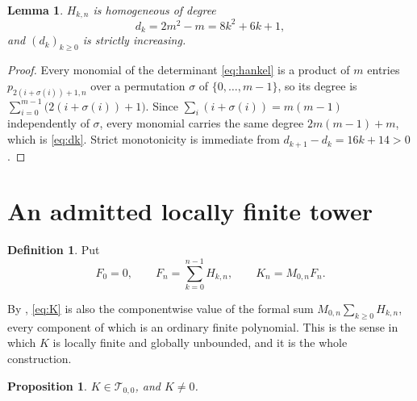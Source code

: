 \documentclass[11pt,reqno]{amsart}
\theoremstyle{plain}
\newtheorem{lemma}[theorem]{Lemma}
\newtheorem{proposition}[theorem]{Proposition}
\theoremstyle{definition}
\newtheorem{definition}[theorem]{Definition}
\theoremstyle{remark}
\numberwithin{equation}{section}
\begin{document}
\begin{lemma}
  \label{lem:degree}
  $H_{k,n}$ is homogeneous of degree
  \begin{equation}
    \label{eq:dk}
    d_k=2m^2-m=8k^2+6k+1,
  \end{equation}
  and $(d_k)_{k\ge0}$ is strictly increasing.
\end{lemma}

\begin{proof}
  Every monomial of the determinant \eqref{eq:hankel} is a product of $m$
  entries $p_{2(i+\sigma(i))+1,n}$ over a permutation $\sigma$ of
  $\{0,\dots,m-1\}$, so its degree is
  $\sum_{i=0}^{m-1}\bigl(2(i+\sigma(i))+1\bigr)$. Since
  $\sum_i(i+\sigma(i))=m(m-1)$ independently of $\sigma$, every monomial
  carries the same degree $2m(m-1)+m$, which is \eqref{eq:dk}. Strict
  monotonicity is immediate from $d_{k+1}-d_k=16k+14>0$.
\end{proof}

\section{An admitted locally finite tower}
\label{sec:K}

\begin{definition}
  \label{def:K}
  Put
  \begin{equation}
    \label{eq:K}
    F_0=0,
    \qquad
    F_n=\sum_{k=0}^{n-1}H_{k,n},
    \qquad
    K_n=M_{0,n}F_n .
  \end{equation}
\end{definition}

By , \eqref{eq:K} is also the componentwise value of the
formal sum $M_{0,n}\sum_{k\ge0}H_{k,n}$, every component of which is an
ordinary finite polynomial. This is the sense in which $K$ is locally finite
and globally unbounded, and it is the whole construction.

\begin{proposition}
  \label{prop:admitted}
  $K\in\mathcal T_{0,0}$, and $K\ne0$.
\end{proposition}
\end{document}
